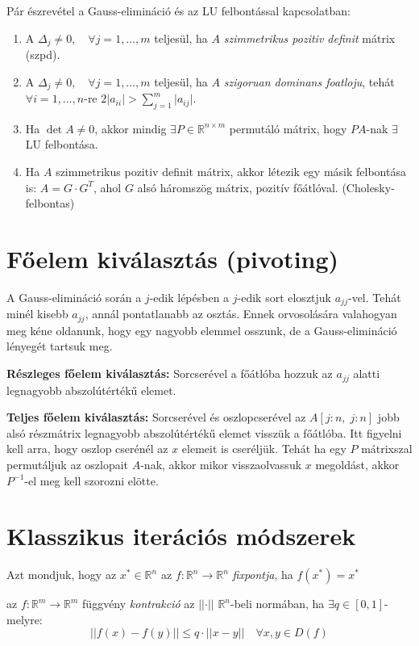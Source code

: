 \begin{megj} Pár észrevétel a Gauss-elimináció és az LU felbontással kapcsolatban:
    \begin{enumerate}
        \item A $\Delta_{j} \neq 0, \quad \forall j = 1, \dots, m$ teljesül, ha $A$ \textit{szimmetrikus pozitiv definit} mátrix (szpd).
        \item A $\Delta_{j} \neq 0, \quad \forall j = 1, \dots, m$ teljesül, ha $A$ \textit{szigoruan dominans foatloju}, tehát $\forall i = 1, \dots, n$-re $2\lvert a_{ii} \rvert > \sum_{j = 1}^{m} \lvert a_{ij} \rvert$.
        \item Ha $\det A \neq 0$, akkor mindig $\exists P \in \mathbb{R}^{n\times m}$ permutáló mátrix, hogy $PA$-nak $\exists$ LU felbontása.
        \item Ha $A$ szimmetrikus pozitiv definit mátrix, akkor létezik egy másik felbontása is: $A = G \cdot G^{T}$, ahol $G$ alsó háromszög mátrix, pozitív főátlóval. (Cholesky-felbontas)
    \end{enumerate}
\end{megj}

\section{Főelem kiválasztás (pivoting)}
A Gauss-elimináció során a $j$-edik lépésben a $j$-edik sort elosztjuk $a_{jj}$-vel. Tehát minél kisebb $a_{jj}$, annál pontatlanabb az osztás. Ennek orvosolására valahogyan meg kéne oldanunk, hogy egy nagyobb elemmel osszunk, de a Gauss-elimináció lényegét tartsuk meg.

\textbf{Részleges főelem kiválasztás:} Sorcserével a főátlóba hozzuk az $a_{jj}$ alatti legnagyobb abszolútértékű elemet.

\textbf{Teljes főelem kiválasztás:} Sorcserével és oszlopcserével az $A[j:n, \; j:n]$ jobb alsó részmátrix legnagyobb abszolútértékű elemet visszük a főátlóba. Itt figyelni kell arra, hogy oszlop cserénél az $x$ elemeit is cseréljük. Tehát ha egy $P$ mátrixszal permutáljuk az oszlopait $A$-nak, akkor mikor visszaolvassuk $x$ megoldást, akkor $P^{-1}$-el meg kell szorozni elötte.

\section{Klasszikus iterációs módszerek}
\begin{definition}
    Azt mondjuk, hogy az $x^{*} \in \mathbb{R}^{n}$ az $f:\mathbb{R}^{n}\to \mathbb{R}^{n}$ \textit{fixpontja}, ha $f(x^{*}) = x^{*}$
\end{definition}
\begin{definition}
    az $f:\mathbb{R}^{m}\to \mathbb{R}^{m}$ függvény \textit{kontrakció} az $\lvert\lvert \cdot \rvert\rvert$ $\mathbb{R}^{n}$-beli normában, ha $\exists q \in [0,1]$-melyre:
    \begin{equation*}
        \lvert\lvert f(x)-f(y) \rvert\rvert \leq q\cdot \lvert\lvert x-y \rvert\rvert \quad \forall x,y \in D(f)
    \end{equation*}
\end{definition}

